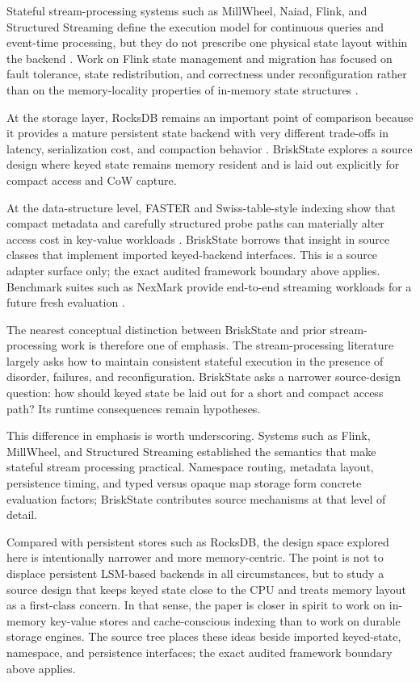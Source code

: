 \documentclass[journal]{IEEEtran}
\newcommand{\briskstate}{BriskState\xspace}
\newcommand{\system}{\briskstate}
\begin{document}
Stateful stream-processing systems such as MillWheel, Naiad, Flink, and Structured Streaming define the execution model for continuous queries and event-time processing, but they do not prescribe one physical state layout within the backend \cite{akidau2013millwheel,murray2013naiad,carbone2015flink,armbrust2018structured,akidau2015dataflow}. Work on Flink state management and migration has focused on fault tolerance, state redistribution, and correctness under reconfiguration rather than on the memory-locality properties of in-memory state structures \cite{carbone2017statemanagement,hoffman2019megaphone}.

At the storage layer, RocksDB remains an important point of comparison because it provides a mature persistent state backend with very different trade-offs in latency, serialization cost, and compaction behavior \cite{rocksdb}. \system explores a source design where keyed state remains memory resident and is laid out explicitly for compact access and CoW capture.

At the data-structure level, FASTER and Swiss-table-style indexing show that compact metadata and carefully structured probe paths can materially alter access cost in key-value workloads \cite{chandramouli2018faster,abseil2018swisstable}. \system borrows that insight in source classes that implement imported keyed-backend interfaces. This is a source adapter surface only; the exact audited framework boundary above applies. Benchmark suites such as NexMark provide end-to-end streaming workloads for a future fresh evaluation \cite{tucker2008nexmark}.

The nearest conceptual distinction between \system and prior stream-processing work is therefore one of emphasis. The stream-processing literature largely asks how to maintain consistent stateful execution in the presence of disorder, failures, and reconfiguration. \system asks a narrower source-design question: how should keyed state be laid out for a short and compact access path? Its runtime consequences remain hypotheses.

This difference in emphasis is worth underscoring. Systems such as Flink, MillWheel, and Structured Streaming established the semantics that make stateful stream processing practical. Namespace routing, metadata layout, persistence timing, and typed versus opaque map storage form concrete evaluation factors; \system contributes source mechanisms at that level of detail.

Compared with persistent stores such as RocksDB, the design space explored here is intentionally narrower and more memory-centric. The point is not to displace persistent LSM-based backends in all circumstances, but to study a source design that keeps keyed state close to the CPU and treats memory layout as a first-class concern. In that sense, the paper is closer in spirit to work on in-memory key-value stores and cache-conscious indexing than to work on durable storage engines. The source tree places these ideas beside imported keyed-state, namespace, and persistence interfaces; the exact audited framework boundary above applies.
\end{document}
